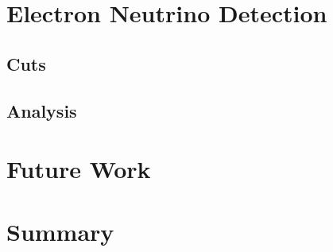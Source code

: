 \documentclass[aps,pra,12pt,notitlepage,tightenlines]{revtex4-1}
\begin{document}
\section{Electron Neutrino Detection}

\subsection{Cuts}

\subsection{Analysis}

\section{Future Work}

\section{Summary}



\end{document}
